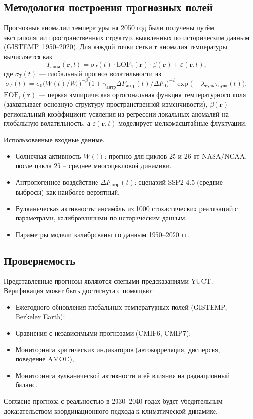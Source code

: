 \documentclass[12pt,a4paper]{article}
\begin{document}
	\subsection{Методология построения прогнозных полей}
	
	Прогнозные аномалии температуры на 2050 год были получены путём экстраполяции пространственных структур, выявленных по историческим данным (GISTEMP, 1950–2020). Для каждой точки сетки \(\mathbf{r}\) аномалия температуры вычисляется как
	\[
	T_{\mathrm{аном}}(\mathbf{r},t) = \sigma_T(t) \cdot \mathrm{EOF}_1(\mathbf{r}) \cdot \beta(\mathbf{r}) + \varepsilon(\mathbf{r},t),
	\]
	где \(\sigma_T(t)\) — глобальный прогноз волатильности из
	\[
	\sigma_T(t) = \sigma_0 \bigl( W(t)/W_0 \bigr)^{-\beta} \bigl(1 + \gamma_{\mathrm{антр}} \Delta F_{\mathrm{антр}}(t)/\Delta F_0\bigr)^{-\beta} \exp\!\bigl(-\lambda_{\text{вулк}} \,\tau_{\text{вулк}}(t)\bigr),
	\]
	\(\mathrm{EOF}_1(\mathbf{r})\) — первая эмпирическая ортогональная функция температурного поля (захватывает основную структуру пространственной изменчивости), \(\beta(\mathbf{r})\) — региональный коэффициент усиления из регрессии локальных аномалий на глобальную волатильность, а \(\varepsilon(\mathbf{r},t)\) моделирует мелкомасштабные флуктуации.
	
	Использованные входные данные:
	\begin{itemize}
		\item Солнечная активность \(W(t)\): прогноз для циклов 25 и 26 от NASA/NOAA, после цикла 26 – среднее многоцикловой динамики.
		\item Антропогенное воздействие \(\Delta F_{\mathrm{антр}}(t)\): сценарий SSP2-4.5 (средние выбросы) как наиболее вероятный.
		\item Вулканическая активность: ансамбль из 1000 стохастических реализаций с параметрами, калиброванными по историческим данным.
		\item Параметры модели калиброваны по данным 1950–2020 гг.
	\end{itemize}
	
	\subsection{Проверяемость}
	
	Представленные прогнозы являются слепыми предсказаниями YUCT. Верификация может быть достигнута с помощью:
	\begin{itemize}
		\item Ежегодного обновления глобальных температурных полей (GISTEMP, Berkeley Earth);
		\item Сравнения с независимыми прогнозами (CMIP6, CMIP7);
		\item Мониторинга критических индикаторов (автокорреляция, дисперсия, поведение AMOC);
		\item Мониторинга вулканической активности и её влияния на радиационный баланс.
	\end{itemize}
	Согласие прогноза с реальностью в 2030–2040 годах будет убедительным доказательством координационного подхода к климатической динамике.
	
\end{document}
